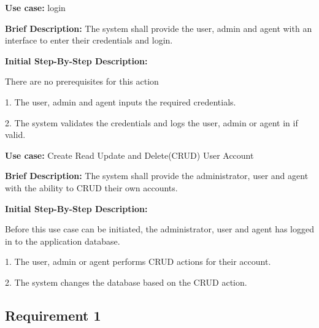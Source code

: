\documentclass{article}
\begin{document}
    \begin{flushleft}
    \textbf{Use case:} login  
    \newline
    	
    \textbf{Brief Description:}
    \newline
    The system shall provide the user, admin and agent with an interface to enter their credentials and login.
    \newline
    
    \textbf{Initial Step-By-Step Description:}
    
    There are no prerequisites for this action
	\newline    

1. The user, admin and agent inputs the required credentials.

2. The system validates the credentials and logs the user, admin or agent in if valid. 

\end{flushleft}

    \begin{flushleft}
    \textbf{Use case:} Create Read Update and Delete(CRUD) User Account  
    \newline
    	
    \textbf{Brief Description:}
    \newline
    The system shall provide the administrator, user and agent with the ability to CRUD their own accounts. 
    \newline
    
    \textbf{Initial Step-By-Step Description:}
    
    Before this use case can be initiated, the administrator, user and agent has logged in to the application database.
	\newline    

1. The user, admin or agent performs CRUD actions for their account.

2. The system changes the database based on the CRUD action.
 

\end{flushleft}
    
    
    
    




    
    
    
    
    
    

    	\subsection{Requirement 1}
\end{document}
